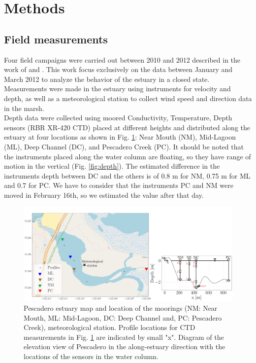 \documentclass[tesis.tex]{subfiles}
\begin{document}
    
\section{Methods}

\subsection{Field measurements}

Four field campaigns were carried out between 2010 and 2012 described in the work of \cite{Williams2014} and \cite{williams2016}. This work focus exclusively on the data between January and March 2012 to analyze the behavior of the estuary in a closed state. Measurements were made in the estuary using instruments for velocity and depth, as well as a meteorological station to collect wind speed and direction data in the marsh. \\

Depth data were collected using moored Conductivity, Temperature, Depth sensors (RBR XR-420 CTD) placed at different heights and distributed along the estuary at four locations as shown in Fig. \ref{fig:mapPDO}: Near Mouth (NM), Mid-Lagoon (ML), Deep Channel (DC), and Pescadero Creek (PC). It should be noted that the instruments placed along the water column are floating, so they have range of motion in the vertical (Fig. \ref{fig:depth}). The estimated difference in the instruments depth between DC and the others is of 0.8 m for NM, 0.75 m for ML and 0.7 for PC. We have to consider that the instruments PC and NM were moved in February 16th, so we estimated the value after that day.\\


\begin{figure}[h!]
    \centering
    \includegraphics[width=\textwidth]{Imagenes/mapa3.png}
    \caption{Pescadero estuary map and location of the moorings (NM: Near Mouth, ML: Mid-Lagoon, DC: Deep Channel and, PC: Pescadero Creek), meteorological station. Profile locations for CTD measurements in Fig. \ref{fig:mapPDO} are indicated by small "x". Diagram of the elevation view of Pescadero in the along-estuary direction with the locations of the sensors in the water column.}
    \label{fig:mapPDO}
\end{figure}
\end{document}
